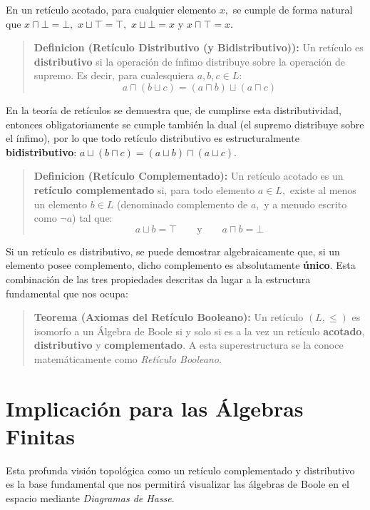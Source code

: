En un retículo acotado, para cualquier elemento $x,$ se cumple de forma natural que $x \sqcap \bot = \bot,$ $x \sqcup \top = \top,$ $x \sqcup \bot = x$ y $x \sqcap \top = x.$

\begin{quote}\textbf{Definicion (Retículo Distributivo (y Bidistributivo)):}\label{reticulo_distributivo}
Un retículo es \textbf{distributivo} si la operación de ínfimo distribuye sobre la operación de supremo. Es decir, para cualesquiera $a,b,c \in L:$
\[ a \sqcap (b \sqcup c) = (a \sqcap b) \sqcup (a \sqcap c) \]
\end{quote}

En la teoría de retículos se demuestra que, de cumplirse esta distributividad, entonces obligatoriamente se cumple también la dual (el supremo distribuye sobre el ínfimo), por lo que todo retículo distributivo es estructuralmente \textbf{bidistributivo}: $a \sqcup (b \sqcap c) = (a \sqcup b) \sqcap (a \sqcup c).$

\begin{quote}\textbf{Definicion (Retículo Complementado):}\label{reticulo_complementado}
Un retículo acotado es un \textbf{retículo complementado} si, para todo elemento $a \in L,$ existe al menos un elemento $b \in L$ (denominado complemento de $a,$ y a menudo escrito como $\neg a$) tal que:
\[ a \sqcup b = \top \qquad \text{y} \qquad a \sqcap b = \bot \]
\end{quote}

Si un retículo es distributivo, se puede demostrar algebraicamente que, si un elemento posee complemento, dicho complemento es absolutamente \textbf{único}. Esta combinación de las tres propiedades descritas da lugar a la estructura fundamental que nos ocupa:

\begin{quote}\textbf{Teorema (Axiomas del Retículo Booleano):}\label{axiomas_reticulo_booleano}
Un retículo $(L, \le)$ es isomorfo a un Álgebra de Boole si y solo si es a la vez un retículo \textbf{acotado}, \textbf{distributivo} y \textbf{complementado}. A esta superestructura se la conoce matemáticamente como \textit{Retículo Booleano}.
\end{quote}

\section{Implicación para las Álgebras Finitas}
Esta profunda visión topológica como un retículo complementado y distributivo es la base fundamental que nos permitirá visualizar las álgebras de Boole en el espacio mediante \textit{Diagramas de Hasse}. 

